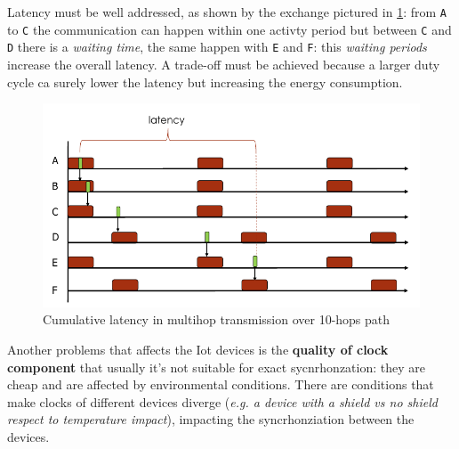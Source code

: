 \documentclass[10pt,a4paper]{report}
\theoremstyle{definition}
\begin{document}
Latency must be well addressed, as shown by the exchange pictured in \ref{smac-latency}: from \texttt{A} to \texttt{C} the communication can happen within one activty period but between \texttt{C} and \texttt{D} there is a \textit{waiting time}, the same happen with \texttt{E} and \texttt{F}: this \textit{waiting periods} increase the overall latency.
A trade-off must be achieved because a larger duty cycle ca surely lower the latency but increasing the energy consumption.
\begin{figure}[h!]
	\centering\includegraphics[scale=0.50]{images/Pasted image 20230405103011.png}
	\caption{Cumulative latency in multihop transmission over 10-hops path}
\label{smac-latency}
\end{figure}


Another problems that affects the Iot devices is the \textbf{quality of clock component} that usually it's not suitable for exact sycnrhonzation: they are cheap and are affected by environmental conditions. There are conditions that make clocks of different devices diverge (\textit{e.g. a device with a shield vs no shield respect to temperature impact}), impacting the syncrhonziation between the devices.
\end{document}
